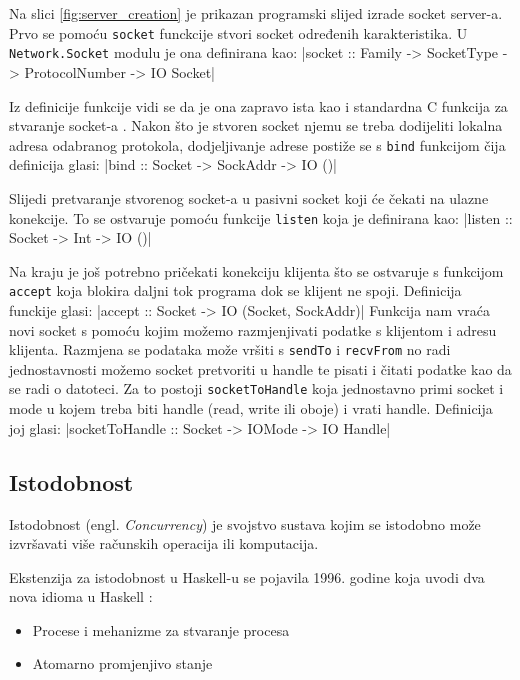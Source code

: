 Na slici \ref{fig:server_creation} je prikazan programski slijed izrade
socket server-a. Prvo se pomoću \texttt{socket} funckcije stvori
socket određenih karakteristika. U \texttt{Network.Socket} modulu
je ona definirana kao:
|socket :: Family -> SocketType -> ProtocolNumber -> IO Socket|

Iz definicije funkcije vidi se da je ona zapravo ista kao i standardna C
funkcija za stvaranje socket-a \cite[str.132]{unixnetwork}. Nakon što je stvoren
socket njemu se treba dodijeliti lokalna adresa odabranog protokola,
dodjeljivanje adrese postiže se s \texttt{bind} funkcijom čija
definicija glasi:
|bind :: Socket -> SockAddr -> IO ()|

Slijedi pretvaranje stvorenog socket-a u pasivni socket koji će čekati na ulazne
konekcije. To se ostvaruje pomoću funkcije \texttt{listen} koja je
definirana kao:
|listen :: Socket -> Int -> IO ()|

Na kraju je još potrebno pričekati konekciju klijenta što se ostvaruje s
funkcijom \texttt{accept} koja blokira daljni tok programa dok se
klijent ne spoji. Definicija funckije glasi:
|accept :: Socket -> IO (Socket, SockAddr)|
Funkcija nam vraća novi socket s pomoću kojim možemo razmjenjivati podatke s
klijentom i adresu klijenta. Razmjena se podataka može vršiti s
\texttt{sendTo} i \texttt{recvFrom} no radi
jednostavnosti možemo socket pretvoriti u handle te pisati i čitati podatke
kao da se radi o datoteci. Za to postoji \texttt{socketToHandle}
koja jednostavno primi socket i mode u kojem treba biti handle (read, write ili
oboje) i vrati handle. Definicija joj glasi:
|socketToHandle :: Socket -> IOMode -> IO Handle|

\subsection{Istodobnost}

Istodobnost (engl. \emph{Concurrency}) je svojstvo sustava kojim se istodobno
može izvršavati više računskih operacija ili komputacija.

Ekstenzija za istodobnost u Haskell-u se pojavila 1996. godine koja uvodi dva
nova idioma u Haskell \cite{concurrent}:
\begin{itemize}
        \item Procese i mehanizme za stvaranje procesa
        \item Atomarno promjenjivo stanje
\end{itemize}

